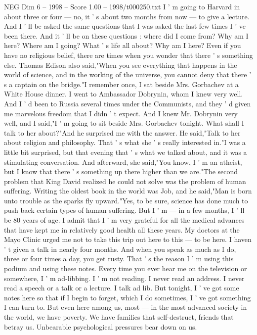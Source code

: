 \begin{textsample}{NEG Dim 6 – 1998 – Score 1.00 – 1998/t000250.txt}
I ' m going to Harvard in about three or four — no, it ' s about two months from now — to give a lecture.
And I ' ll be asked the same questions that I was asked the last few times I ' ve been there.
And it ' ll be on these questions : where did I come from?
Why am I here?
Where am I going?
What ' s life all about?
Why am I here?
Even if you have no religious belief, there are times when you wonder that there ' s something else.
Thomas Edison also said,"When you see everything that happens in the world of science, and in the working of the universe, you cannot deny that there ' s a captain on the bridge."I remember once, I sat beside Mrs.
Gorbachev at a White House dinner.
I went to Ambassador Dobrynin, whom I knew very well.
And I ' d been to Russia several times under the Communists, and they ' d given me marvelous freedom that I didn ' t expect.
And I knew Mr.
Dobrynin very well, and I said,"I ' m going to sit beside Mrs.
Gorbachev tonight.
What shall I talk to her about?"And he surprised me with the answer.
He said,"Talk to her about religion and philosophy.
That ' s what she ' s really interested in."I was a little bit surprised, but that evening that ' s what we talked about, and it was a stimulating conversation.
And afterward, she said,"You know, I ' m an atheist, but I know that there ' s something up there higher than we are."The second problem that King David realized he could not solve was the problem of human suffering.
Writing the oldest book in the world was Job, and he said,"Man is born unto trouble as the sparks fly upward."Yes, to be sure, science has done much to push back certain types of human suffering.
But I ' m — in a few months, I ' ll be 80 years of age.
I admit that I ' m very grateful for all the medical advances that have kept me in relatively good health all these years.
My doctors at the Mayo Clinic urged me not to take this trip out here to this — to be here.
I haven ' t given a talk in nearly four months.
And when you speak as much as I do, three or four times a day, you get rusty.
That ' s the reason I ' m using this podium and using these notes.
Every time you ever hear me on the television or somewhere, I ' m ad-libbing.
I ' m not reading.
I never read an address.
I never read a speech or a talk or a lecture.
I talk ad lib.
But tonight, I ' ve got some notes here so that if I begin to forget, which I do sometimes, I ' ve got something I can turn to.
But even here among us, most — in the most advanced society in the world, we have poverty.
We have families that self-destruct, friends that betray us.
Unbearable psychological pressures bear down on us.

\end{textsample}
